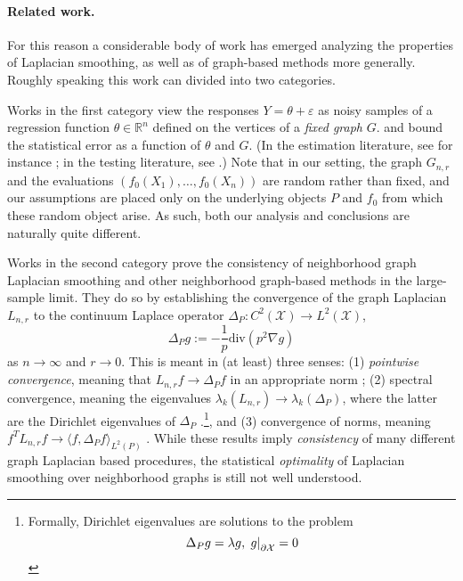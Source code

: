 \documentclass[twoside]{article}
\newcommand{\Reals}{\mathbb{R}}
\newcommand{\restr}[2]{\ensuremath{\left.#1\right|_{#2}}}
\newcommand{\1}{\mathbf{1}}
\newcommand{\Lap}{L}
\newcommand{\Xset}{\mathcal{X}}
\newcommand{\Leb}{L}
\newcommand{\dive}{\mathrm{div}}
\theoremstyle{definition}
\theoremstyle{remark}
\begin{document}
\paragraph{Related work.} For this reason a considerable body of work has emerged analyzing the properties of Laplacian smoothing, as well as of graph-based methods more generally. Roughly speaking this work can divided into two categories.

Works in the first category view the responses $Y = \theta + \varepsilon$ as noisy samples of a regression function $\theta \in \Reals^n$ defined on the vertices of a \emph{fixed graph} $G$. and bound the statistical error as a function of $\theta$ and $G$. (In the estimation literature, see for instance \citep{wang2016, sadhanala16,sadhanala17,kirichenko2017,kirichenko2018}; in the testing literature, see \citep{sharpnack2013,sharpnack2013b,sharpnack2015}.) Note that in our setting, the graph $G_{n,r}$ and the evaluations $(f_0(X_1),\ldots,f_0(X_n))$ are random rather than fixed, and our assumptions are placed only on the underlying objects $P$ and $f_0$ from which these random object arise. As such, both our analysis and conclusions are naturally quite different.

Works in the second category prove the consistency of neighborhood graph Laplacian smoothing and other neighborhood graph-based methods in the large-sample limit. They do so by establishing the convergence of the graph Laplacian $\Lap_{{n,r}}$ to the continuum Laplace operator $\Delta_P: C^2(\Xset) \to \Leb^2(\Xset)$,
\begin{equation}
\label{eqn:laplace_operator}
\Delta_Pg := -\frac{1}{p} \dive(p^2 \nabla g)
\end{equation}
as $n \to \infty$ and $r \to 0$. This is meant in (at least) three senses: (1) \emph{pointwise convergence}, meaning that $\Lap_{n,r}f \to \Delta_Pf$ in an appropriate norm \citep{belkin03,belkin05,lafon04,hein05,singer06,gine06}; (2) spectral convergence, meaning the eigenvalues $\lambda_k(\Lap_{n,r}) \to \lambda_k(\Delta_P)$, where the latter are the Dirichlet eigenvalues of $\Delta_P$ \citep{belkin07,burago2014,trillos2018,trillos2019,calder2019}.\footnote{\label{footnote:dirichlet_eigenvalues} Formally, Dirichlet eigenvalues are solutions to the problem
	$$
	\Delta_Pg = \lambda g,\\
	\restr{g}{\partial \Xset} = 0
	$$}, and (3) convergence of norms, meaning $f^T \Lap_{n,r} f \to \langle f,\Delta_Pf \rangle_{\Leb^2(P)}$ \citep{bousquet03,hein06,zhou11}. While these results imply \emph{consistency} of many different graph Laplacian based procedures, the statistical \emph{optimality} of Laplacian smoothing over neighborhood graphs is still not well understood.
\end{document}

